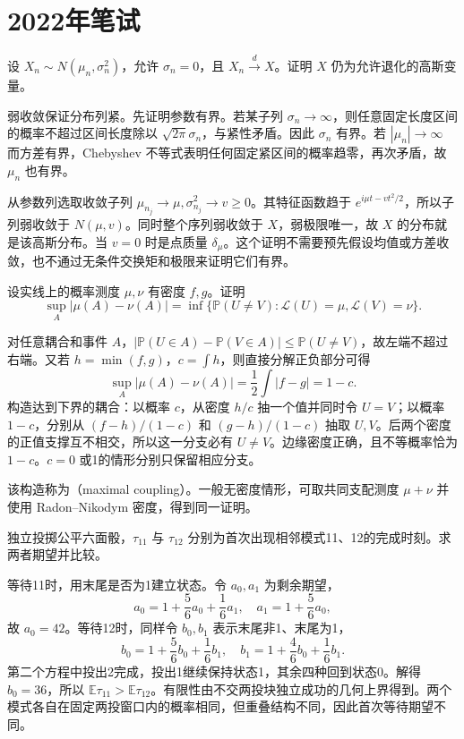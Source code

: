 \documentclass[UTF8,12pt,a4paper,fontset=fandol]{ctexbook}
\newcommand{\E}{\mathbb E}
\newcommand{\PP}{\mathbb P}
\begin{document}
\section{2022年笔试}
\begin{example}[原题1：高斯分布族对弱极限封闭]\label{yau:2022-1}
设 $X_n\sim N(\mu_n,\sigma_n^2)$，允许 $\sigma_n=0$，且 $X_n\xrightarrow dX$。证明 $X$ 仍为允许退化的高斯变量。
\end{example}
\begin{solve}
弱收敛保证分布列紧。先证明参数有界。若某子列 $\sigma_n\to\infty$，则任意固定长度区间的概率不超过区间长度除以 $\sqrt{2\pi}\sigma_n$，与紧性矛盾。因此 $\sigma_n$ 有界。若 $|\mu_n|\to\infty$ 而方差有界，Chebyshev 不等式表明任何固定紧区间的概率趋零，再次矛盾，故 $\mu_n$ 也有界。

从参数列选取收敛子列 $\mu_{n_j}\to\mu,\sigma_{n_j}^2\to v\ge0$。其特征函数趋于 $e^{i\mu t-vt^2/2}$，所以子列弱收敛于 $N(\mu,v)$。同时整个序列弱收敛于 $X$，弱极限唯一，故 $X$ 的分布就是该高斯分布。当 $v=0$ 时是点质量 $\delta_\mu$。这个证明不需要预先假设均值或方差收敛，也不通过无条件交换矩和极限来证明它们有界。
\end{solve}

\begin{example}[原题2：全变差距离的最大耦合表示]\label{yau:2022-2}
设实线上的概率测度 $\mu,\nu$ 有密度 $f,g$。证明
\[
\sup_A|\mu(A)-\nu(A)|=\inf\{\PP(U\ne V):\mathcal L(U)=\mu,\mathcal L(V)=\nu\}.
\]
\end{example}
\begin{solve}
对任意耦合和事件 $A$，$|\PP(U\in A)-\PP(V\in A)|\le\PP(U\ne V)$，故左端不超过右端。又若 $h=\min(f,g)$，$c=\int h$，则直接分解正负部分可得
\[
\sup_A|\mu(A)-\nu(A)|=\frac12\int|f-g|=1-c.
\]
构造达到下界的耦合：以概率 $c$，从密度 $h/c$ 抽一个值并同时令 $U=V$；以概率 $1-c$，分别从 $(f-h)/(1-c)$ 和 $(g-h)/(1-c)$ 抽取 $U,V$。后两个密度的正值支撑互不相交，所以这一分支必有 $U\ne V$。边缘密度正确，且不等概率恰为 $1-c$。$c=0$ 或1的情形分别只保留相应分支。

该构造称为（maximal coupling）。一般无密度情形，可取共同支配测度 $\mu+\nu$ 并使用 Radon--Nikodym 密度，得到同一证明。
\end{solve}

\begin{example}\label{yau:2022-3}
独立投掷公平六面骰，$\tau_{11}$ 与 $\tau_{12}$ 分别为首次出现相邻模式11、12的完成时刻。求两者期望并比较。
\end{example}
\begin{solve}
等待11时，用末尾是否为1建立状态。令 $a_0,a_1$ 为剩余期望，
\[
a_0=1+\frac56a_0+\frac16a_1,\quad a_1=1+\frac56a_0,
\]
故 $a_0=42$。等待12时，同样令 $b_0,b_1$ 表示末尾非1、末尾为1，
\[
b_0=1+\frac56b_0+\frac16b_1,\quad b_1=1+\frac46b_0+\frac16b_1.
\]
第二个方程中投出2完成，投出1继续保持状态1，其余四种回到状态0。解得 $b_0=36$，所以 $\E\tau_{11}>\E\tau_{12}$。有限性由不交两投块独立成功的几何上界得到。两个模式各自在固定两投窗口内的概率相同，但重叠结构不同，因此首次等待期望不同。
\end{solve}
\end{document}
